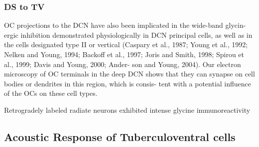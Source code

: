 \subsubsection{DS to TV}
OC projections to the DCN have also been implicated in the wide-band glycin-
ergic inhibition demonstrated physiologically in DCN
principal cells, as well as in the cells designated type II or
vertical (Caspary et al., 1987; Young et al., 1992; Nelken
and Young, 1994; Backoff et al., 1997; Joris and Smith,
1998; Spirou et al., 1999; Davis and Young, 2000; Ander-
son and Young, 2004). Our electron microscopy of OC
terminals in the deep DCN shows that they can synapse
on cell bodies or dendrites in this region, which is consis-
tent with a potential inﬂuence of the OCs on these cell
types.

\citep{DoucetRossEtAl:1999,DoucetRyugo:1997,FriedlandPongstapornEtAl:2003,DoucetRyugo:2006}
Retrogradely labeled radiate neurons exhibited intense glycine immunoreactivity



\subsection{Acoustic Response of Tuberculoventral cells}


